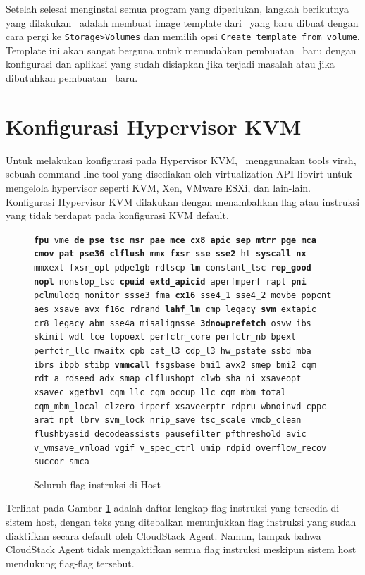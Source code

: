 Setelah selesai menginstal semua program yang diperlukan, langkah berikutnya yang dilakukan \saya\ adalah membuat image template dari \vm\ yang baru dibuat dengan cara pergi ke \texttt{Storage>Volumes} dan memilih opsi \texttt{Create template from volume}. Template ini akan sangat berguna untuk memudahkan pembuatan \vm\ baru dengan konfigurasi dan aplikasi yang sudah disiapkan jika terjadi masalah atau jika dibutuhkan pembuatan \vm\ baru.

\section{Konfigurasi Hypervisor KVM}
Untuk melakukan konfigurasi pada Hypervisor KVM, \saya\ menggunakan tools virsh, sebuah command line tool yang disediakan oleh virtualization API libvirt untuk mengelola hypervisor seperti KVM, Xen, VMware ESXi, dan lain-lain. Konfigurasi Hypervisor KVM dilakukan dengan menambahkan flag atau instruksi yang tidak terdapat pada konfigurasi KVM default.

\begin{figure}
    \texttt{\textbf{fpu} vme \textbf{de pse tsc msr pae mce cx8 apic sep mtrr pge mca cmov pat pse36 clflush mmx fxsr sse sse2} ht \textbf{syscall nx} mmxext fxsr\_opt pdpe1gb rdtscp \textbf{lm} constant\_tsc \textbf{rep\_good} \textbf{nopl} nonstop\_tsc \textbf{cpuid extd\_apicid} aperfmperf rapl \textbf{pni} pclmulqdq monitor ssse3 fma \textbf{cx16} sse4\_1 sse4\_2 movbe popcnt aes xsave avx f16c rdrand \textbf{lahf\_lm} cmp\_legacy \textbf{svm} extapic cr8\_legacy abm sse4a misalignsse \textbf{3dnowprefetch} osvw ibs skinit wdt tce topoext perfctr\_core perfctr\_nb bpext perfctr\_llc mwaitx cpb cat\_l3 cdp\_l3 hw\_pstate ssbd mba ibrs ibpb stibp \textbf{vmmcall} fsgsbase bmi1 avx2 smep bmi2 cqm rdt\_a rdseed adx smap clflushopt clwb sha\_ni xsaveopt xsavec xgetbv1 cqm\_llc cqm\_occup\_llc cqm\_mbm\_total cqm\_mbm\_local clzero irperf xsaveerptr rdpru wbnoinvd cppc arat npt lbrv svm\_lock nrip\_save tsc\_scale vmcb\_clean flushbyasid decodeassists pausefilter pfthreshold avic v\_vmsave\_vmload vgif v\_spec\_ctrl umip rdpid overflow\_recov succor smca}
    \caption{Seluruh flag instruksi di Host}
    \label{fig:flag_kvm_host}
\end{figure}

Terlihat pada Gambar \ref{fig:flag_kvm_host} adalah daftar lengkap flag instruksi yang tersedia di sistem host, dengan teks yang ditebalkan menunjukkan flag instruksi yang sudah diaktifkan secara default oleh CloudStack Agent. Namun, tampak bahwa CloudStack Agent tidak mengaktifkan semua flag instruksi meskipun sistem host mendukung flag-flag tersebut.

